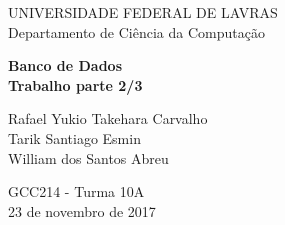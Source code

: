 \begin{titlepage}

\begin{center}
{\large UNIVERSIDADE FEDERAL DE LAVRAS}\\[5mm] 
{\large Departamento de Ciência da Computação}\\[9cm] 
\end{center}

\begin{center}
{\bf \huge Banco de Dados}\\[5mm]
{\bf \large Trabalho parte 2/3}\\[1cm]
\end{center}

\begin{flushright}
{Rafael Yukio Takehara Carvalho}\\[2mm] 
{Tarik Santiago Esmin}\\[2mm] 
{William dos Santos Abreu}\\[7cm]
\end{flushright}

\begin{center}
{GCC214 - Turma 10A}\\[2mm]
{23 de novembro de 2017}
\end{center}

\end{titlepage}